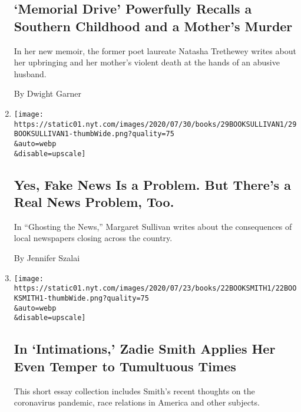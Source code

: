 \begin{enumerate}
  \hypertarget{memorial-drive-powerfully-recalls-a-southern-childhood-and-a-mothers-murder}{%
  \subsection{`Memorial Drive' Powerfully Recalls a Southern Childhood
  and a Mother's
  Murder}\label{memorial-drive-powerfully-recalls-a-southern-childhood-and-a-mothers-murder}}

  In her new memoir, the former poet laureate Natasha Trethewey writes
  about her upbringing and her mother's violent death at the hands of an
  abusive husband.

  By Dwight Garner
\item
  \href{/2020/07/26/books/review-ghosting-news-local-journalism-democracy-crisis-margaret-sullivan.html}{}

  \texttt{[image: https://static01.nyt.com/images/2020/07/30/books/29BOOKSULLIVAN1/29BOOKSULLIVAN1-thumbWide.png?quality=75\\\&auto=webp\\\&disable=upscale]}

  \hypertarget{yes-fake-news-is-a-problem-but-theres-a-real-news-problem-too}{%
  \subsection{Yes, Fake News Is a Problem. But There's a Real News
  Problem,
  Too.}\label{yes-fake-news-is-a-problem-but-theres-a-real-news-problem-too}}

  In ``Ghosting the News,'' Margaret Sullivan writes about the
  consequences of local newspapers closing across the country.

  By Jennifer Szalai
\item
  \href{/2020/07/22/books/review-intimations-essays-zadie-smith.html}{}

  \texttt{[image: https://static01.nyt.com/images/2020/07/23/books/22BOOKSMITH1/22BOOKSMITH1-thumbWide.png?quality=75\\\&auto=webp\\\&disable=upscale]}

  \hypertarget{in-intimations-zadie-smith-applies-her-even-temper-to-tumultuous-times}{%
  \subsection{In `Intimations,' Zadie Smith Applies Her Even Temper to
  Tumultuous
  Times}\label{in-intimations-zadie-smith-applies-her-even-temper-to-tumultuous-times}}

  This short essay collection includes Smith's recent thoughts on the
  coronavirus pandemic, race relations in America and other subjects.


\end{enumerate}

